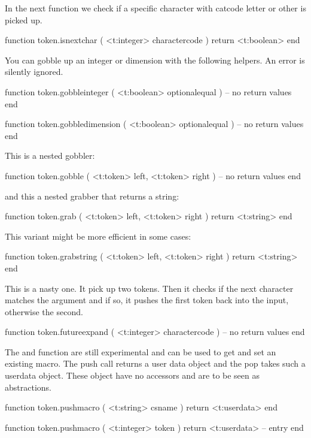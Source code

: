 In the next function we check if a specific character with catcode
letter or other is picked up.

\starttyping[option=LUA]
function token.isnextchar ( <t:integer> charactercode  )
    return <t:boolean>
end
\stoptyping

\stopsubsection

\startsubsection[title={Gobbling}]

You can gobble up an integer or dimension with the following helpers. An error is silently
ignored.

\starttyping[option=LUA]
function token.gobbleinteger ( <t:boolean> optionalequal )
    -- no return values
end

function token.gobbledimension ( <t:boolean> optionalequal )
    -- no return values
end
\stoptyping

This is a nested gobbler:

\starttyping[option=LUA]
function token.gobble ( <t:token> left, <t:token> right )
    -- no return values
end
\stoptyping

and this a nested grabber that returns a string:

\starttyping[option=LUA]
function token.grab ( <t:token> left, <t:token> right )
    return <t:string>
end
\stoptyping

This variant might be more efficient in some cases:

\starttyping[option=LUA]
function token.grabstring ( <t:token> left, <t:token> right )
    return <t:string>
end
\stoptyping

\stopsubsection

\startsubsection[title={Macros}]

This is a nasty one. It pick up two tokens. Then it checks if the next character
matches the argument and if so, it pushes the first token back into the input,
otherwise the second.

\starttyping[option=LUA]
function token.futureexpand ( <t:integer> charactercode )
    -- no return values
end
\stoptyping

The  and  function are still experimental and
can be used to get and set an existing macro. The push call returns a user data
object and the pop takes such a userdata object. These object have no accessors
and are to be seen as abstractions.

\starttyping[option=LUA]
function token.pushmacro ( <t:string> csname )
    return <t:userdata>
end

function token.pushmacro ( <t:integer> token )
    return <t:userdata> -- entry
end
\stoptyping

